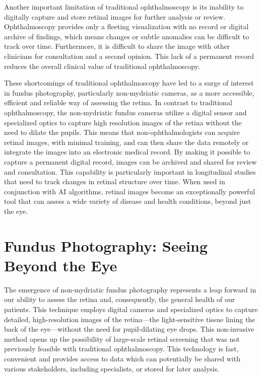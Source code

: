 \documentclass[
  Letterpaper,
]{scrbook}
\begin{document}
Another important limitation of traditional ophthalmoscopy is its
inability to digitally capture and store retinal images for further
analysis or review. Ophthalmoscopy provides only a fleeting
visualization with no record or digital archive of findings, which means
changes or subtle anomalies can be difficult to track over time.
Furthermore, it is difficult to share the image with other clinicians
for consultation and a second opinion. This lack of a permanent record
reduces the overall clinical value of traditional ophthalmoscopy.

These shortcomings of traditional ophthalmoscopy have led to a surge of
interest in fundus photography, particularly non-mydriatic cameras, as a
more accessible, efficient and reliable way of assessing the retina. In
contrast to traditional ophthalmoscopy, the non-mydriatic fundus cameras
utilize a digital sensor and specialized optics to capture high
resolution images of the retina without the need to dilate the pupils.
This means that non-ophthalmologists can acquire retinal images, with
minimal training, and can then share the data remotely or integrate the
images into an electronic medical record. By making it possible to
capture a permanent digital record, images can be archived and shared
for review and consultation. This capability is particularly important
in longitudinal studies that need to track changes in retinal structure
over time. When used in conjunction with AI algorithms, retinal images
become an exceptionally powerful tool that can assess a wide variety of
disease and health conditions, beyond just the eye.

\section{Fundus Photography: Seeing Beyond the
Eye}\label{fundus-photography-seeing-beyond-the-eye}

The emergence of non-mydriatic fundus photography represents a leap
forward in our ability to assess the retina and, consequently, the
general health of our patients. This technique employs digital cameras
and specialized optics to capture detailed, high-resolution images of
the retina---the light-sensitive tissue lining the back of the
eye---without the need for pupil-dilating eye drops. This non-invasive
method opens up the possibility of large-scale retinal screening that
was not previously feasible with traditional ophthalmoscopy. This
technology is fast, convenient and provides access to data which can
potentially be shared with various stakeholders, including specialists,
or stored for later analysis.
\end{document}
